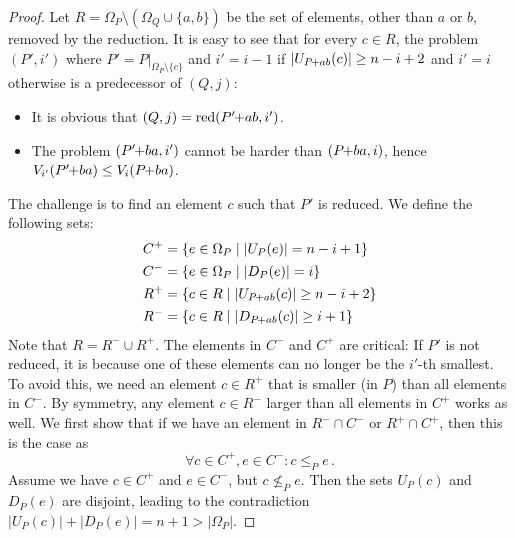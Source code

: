 \documentclass[a4paper,UKenglish,cleveref, autoref, thm-restate, anonymous]{lipics-v2021}
\newcommand{\pchild}[3]{{#1}\kern-1pt{+}{#2}{#3}}
\newcommand{\reduced}[1]{\operatorname{red}#1}
\newcommand{\less}[2]{D_{#1}(#2)}
\newcommand{\greater}[2]{U_{#1}(#2)}
\begin{document}
\begin{proof}
  Let $R = \Omega_P \setminus (\Omega_Q \cup \{a, b\})$ be the set of elements, other than $a$ or $b$, removed by the reduction.
  It is easy to see that for every $c \in R$, the problem $(P', i')$ where $P' = P|_{\Omega_P \setminus \{c\}}$ and $i' = i - 1$ if $|\greater{\pchild{P}{a}{b}}{c}| \ge n - i + 2$ and $i' = i$ otherwise is a predecessor of $(Q, j)$:
  \begin{itemize}
    \item It is obvious that $(Q, j) = \reduced{(\pchild{P'}{a}{b}, i')}$.
    \item The problem $(\pchild{P'}{b}{a}, i')$ cannot be harder than $(\pchild{P}{b}{a}, i)$, hence $V_{i'}(\pchild{P'}{b}{a}) \leq V_i(\pchild{P}{b}{a})$.
  \end{itemize}
  The challenge is to find an element $c$ such that $P'$ is reduced.
  We define the following sets:
  \begin{align*}
    C^+ & = \{e \in \Omega_P \mid |\greater{P}{e}| = n - i + 1\}            \\
    C^- & = \{e \in \Omega_P \mid |\less{P}{e}| = i \}                      \\
    R^+ & = \{c \in R \mid |\greater{\pchild{P}{a}{b}}{c}| \ge n - i + 2 \} \\
    R^- & = \{c \in R \mid |\less{\pchild{P}{a}{b}}{c}| \ge i + 1 \}
  \end{align*}
  Note that $R = R^- \cup R^+$.
  The elements in $C^-$ and $C^+$ are critical:
  If $P'$ is not reduced, it is because one of these elements can no longer be the $i'$-th smallest.
  To avoid this, we need an element $c \in R^+$ that is smaller (in $P$) than all elements in $C^-$.
  By symmetry, any element $c \in R^-$ larger than all elements in $C^+$ works as well.
  We first show that if we have an element in $R^- \cap C^-$ or $R^+ \cap C^+$, then this is the case as
  \begin{equation}
    \forall c \in C^+, e \in C^- \colon c \le_P e\,\text{.}
  \end{equation}
  Assume we have $c \in C^+$ and $e \in C^-$, but $c \not\le_P e$.
  Then the sets $\greater{P}{c}$ and $\less{P}{e}$ are disjoint, leading to the contradiction $|\greater{P}{c}| + |\less{P}{e}| = n + 1 > |\Omega_P|$.


\end{proof}
\end{document}
